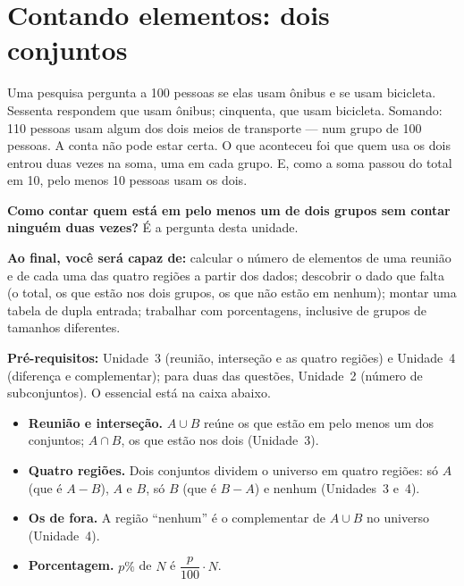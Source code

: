\clearpage
\section{Contando elementos: dois conjuntos}

\Prefacio
\begin{prefacio}

Uma pesquisa pergunta a 100 pessoas se elas usam ônibus e se usam bicicleta. Sessenta respondem que usam ônibus; cinquenta, que usam bicicleta. Somando: 110 pessoas usam algum dos dois meios de transporte — num grupo de 100 pessoas. A conta não pode estar certa. O que aconteceu foi que quem usa os dois entrou duas vezes na soma, uma em cada grupo. E, como a soma passou do total em 10, pelo menos 10 pessoas usam os dois.

\textbf{Como contar quem está em pelo menos um de dois grupos sem contar ninguém duas vezes?} É a pergunta desta unidade.

\textbf{Ao final, você será capaz de:} calcular o número de elementos de uma reunião e de cada uma das quatro regiões a partir dos dados; descobrir o dado que falta (o total, os que estão nos dois grupos, os que não estão em nenhum); montar uma tabela de dupla entrada; trabalhar com porcentagens, inclusive de grupos de tamanhos diferentes.

\textbf{Pré-requisitos:} Unidade~3 (reunião, interseção e as quatro regiões) e Unidade~4 (diferença e complementar); para duas das questões, Unidade~2 (número de subconjuntos). O essencial está na caixa abaixo.
\end{prefacio}

\begin{minimo}
\begin{itemize}[leftmargin=1.4em,itemsep=1pt]
  \item \textbf{Reunião e interseção.} $A\cup B$ reúne os que estão em pelo menos um dos conjuntos; $A\cap B$, os que estão nos dois (Unidade~3).
  \item \textbf{Quatro regiões.} Dois conjuntos dividem o universo em quatro regiões: só $A$ (que é $A-B$), $A$ e $B$, só $B$ (que é $B-A$) e nenhum (Unidades~3 e~4).
  \item \textbf{Os de fora.} A região \enquote{nenhum} é o complementar de $A\cup B$ no universo (Unidade~4).
  \item \textbf{Porcentagem.} $p\%$ de $N$ é $\dfrac{p}{100}\cdot N$.
\end{itemize}
\end{minimo}


